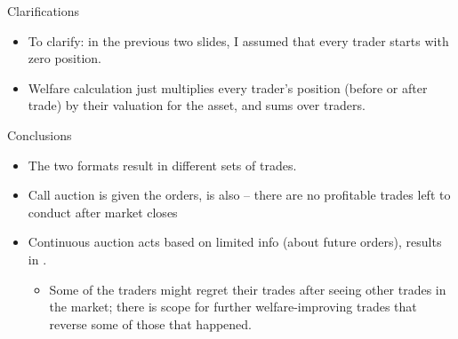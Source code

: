\documentclass[english,10pt
,aspectratio=169
]{beamer}
\begin{document}
\begin{frame}{Clarifications}
	\begin{itemize}
		\item To clarify: in the previous two slides, I assumed that every trader starts with zero position.
		\item Welfare calculation just multiplies every trader's position (before or after trade) by their valuation for the asset, and sums over traders.
	\end{itemize}
\end{frame}


\begin{frame}{Conclusions}
	\begin{itemize}
		\item The two formats result in different sets of trades. 
		\item \alert{Call auction} is  given the orders, is also  -- there are no profitable trades left to conduct after market closes
		\item \alert{Continuous auction} acts based on limited info (about future orders), results in .
		\begin{itemize}
			\item Some of the traders might regret their trades after seeing other trades in the market; there is scope for further welfare-improving trades that reverse some of those that happened.
		\end{itemize}
	\end{itemize}
\end{frame}
\end{document}
